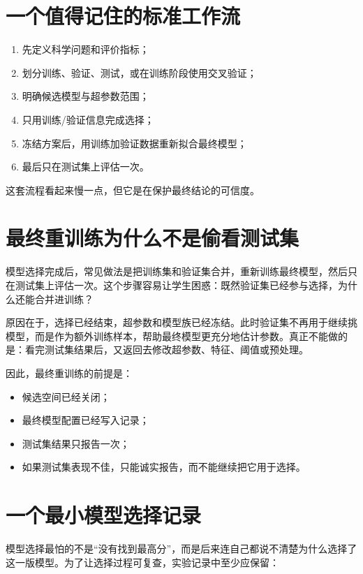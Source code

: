 \section{一个值得记住的标准工作流}

\begin{enumerate}
    \item 先定义科学问题和评价指标；
    \item 划分训练、验证、测试，或在训练阶段使用交叉验证；
    \item 明确候选模型与超参数范围；
    \item 只用训练/验证信息完成选择；
    \item 冻结方案后，用训练加验证数据重新拟合最终模型；
    \item 最后只在测试集上评估一次。
\end{enumerate}

这套流程看起来慢一点，但它是在保护最终结论的可信度。

\section{最终重训练为什么不是偷看测试集}

模型选择完成后，常见做法是把训练集和验证集合并，重新训练最终模型，然后只在测试集上评估一次。这个步骤容易让学生困惑：既然验证集已经参与选择，为什么还能合并进训练？

原因在于，选择已经结束，超参数和模型族已经冻结。此时验证集不再用于继续挑模型，而是作为额外训练样本，帮助最终模型更充分地估计参数。真正不能做的是：看完测试集结果后，又返回去修改超参数、特征、阈值或预处理。

因此，最终重训练的前提是：

\begin{itemize}
    \item 候选空间已经关闭；
    \item 最终模型配置已经写入记录；
    \item 测试集结果只报告一次；
    \item 如果测试集表现不佳，只能诚实报告，而不能继续把它用于选择。
\end{itemize}

\section{一个最小模型选择记录}

模型选择最怕的不是“没有找到最高分”，而是后来连自己都说不清楚为什么选择了这一版模型。为了让选择过程可复查，实验记录中至少应保留：

